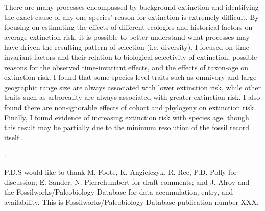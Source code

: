\documentclass[12pt]{article}
\newcounter{lastnote}
\newenvironment{scilastnote}{%
\setcounter{lastnote}{\value{enumiv}}%
\addtocounter{lastnote}{+1}%
\begin{list}%
{\arabic{lastnote}.}
{\setlength{\leftmargin}{.22in}}
{\setlength{\labelsep}{.5em}}}
{\end{list}}
\begin{document}
There are many processes encompassed by background extinction and identifying the exact cause of any one species' reason for extinction is extremely difficult. By focusing on estimating the effects of different ecologies and historical factors on average extinction risk, it is possible to better understand what processes may have driven the resulting pattern of selection (i.e. diversity). I focused on time-invariant factors and their relation to biological selectivity of extinction, possible reasons for the observed time-invariant effects, and the effects of taxon-age on extinction risk. I found that some species-level traits such as omnivory and large geographic range size are always associated with lower extinction risk, while other traits such as arboreality are always associated with greater extinction risk. I also found there are non-ignorable effects of cohort and phylogeny on extinction risk. Finally, I found evidence of increasing extinction risk with species age, though this result may be partially due to the minimum resolution of the fossil record itself \cite{Sepkoski1975}.





\begin{scilastnote}
\item P.D.S would like to thank M. Foote, K. Angielczyk, R. Ree, P.D. Polly for discussion; E. Sander, N. Pierrehumbert for draft comments; and J. Alroy and the Fossilworks/Paleobiology Database for data accumulation, entry, and availability. This is Fossilworks/Paleobiology Database publication number XXX.
\end{scilastnote}


\end{document}
